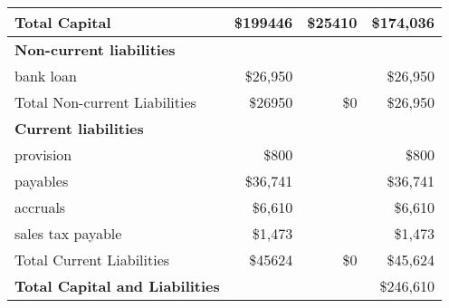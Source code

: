 \begin{center}
\begin{tabular}{lrrr}
\addlinespace
Total Capital & \$199446 & \$25410 & \$174,036 \\
\midrule
\textbf{Non-current liabilities} & & & \\
 bank loan & \$26,950 &  & \$26,950 \\ 

\addlinespace
Total Non-current Liabilities & \$26950 & \$0 & \$26,950 \\
\midrule
\textbf{Current liabilities} & & & \\
 provision & \$800 &  & \$800 \\ 
payables & \$36,741 &  & \$36,741 \\ 
accruals & \$6,610 &  & \$6,610 \\ 
sales tax payable & \$1,473 &  & \$1,473 \\ 

\addlinespace
Total Current Liabilities & \$45624 &\$0 & \$45,624\\
\midrule
\textbf{Total Capital and Liabilities} & & & \$246,610 \\
\bottomrule
\end{tabular}
\end{center}

      
